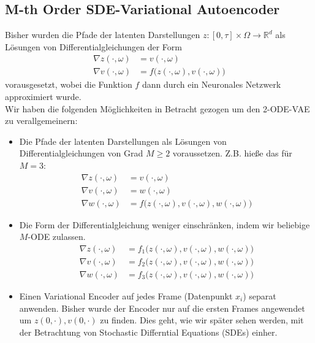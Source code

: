 \documentclass[12pt]{article}
\newcommand{\R}{\mathbb{R}}
\begin{document}
	\subsection[SDE-VAE]{M-th Order SDE-Variational Autoencoder}
		Bisher wurden die Pfade der latenten Darstellungen $z : [0,\tau] \times \Omega \rightarrow \R^d$ als Lösungen von Differentialgleichungen der Form
	\begin{align*}
		\nabla z(\cdot,\omega) &= v(\cdot,\omega)\\
		\nabla v(\cdot,\omega) &= f\big(z(\cdot,\omega),v(\cdot,\omega)\big)
	\end{align*}
	vorausgesetzt, wobei die Funktion $f$ dann durch ein Neuronales Netzwerk approximiert wurde.\\
	Wir haben die folgenden Möglichkeiten in Betracht gezogen um den 2-ODE-VAE zu verallgemeinern:
	\begin{itemize}
		\item Die Pfade der latenten Darstellungen als Lösungen von Differentialgleichungen von Grad $M \geq 2$ voraussetzen. Z.B. hieße das für $M=3$:
		\begin{align*}
			\nabla z(\cdot,\omega) &= v(\cdot,\omega)\\
			\nabla v(\cdot,\omega) &= w(\cdot,\omega)\\
			\nabla w(\cdot,\omega) &= f\big(z(\cdot,\omega),v(\cdot,\omega),w(\cdot,\omega)\big)
		\end{align*}
		
		\item Die Form der Differentialgleichung weniger einschränken, indem wir beliebige $M$-ODE zulassen.
		\begin{align*}
			\nabla z(\cdot,\omega) &= f_1\big(z(\cdot,\omega),v(\cdot,\omega),w(\cdot,\omega)\big)\\
			\nabla v(\cdot,\omega) &= f_2\big(z(\cdot,\omega),v(\cdot,\omega),w(\cdot,\omega)\big)\\
			\nabla w(\cdot,\omega) &= f_3\big(z(\cdot,\omega),v(\cdot,\omega),w(\cdot,\omega)\big)
		\end{align*}
		
		\item Einen Variational Encoder auf jedes Frame (Datenpunkt $x_i$) separat anwenden. Bisher wurde der Encoder nur auf die ersten Frames angewendet um $z(0,\cdot), v(0,\cdot)$ zu finden. Dies geht, wie wir später sehen werden, mit der Betrachtung von Stochastic Differntial Equations (SDEs) einher.
	\end{itemize}
	
\end{document}
